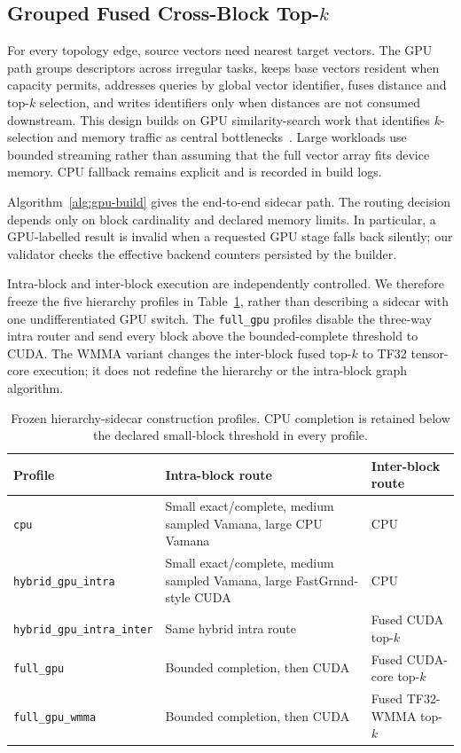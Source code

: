 \documentclass[sigconf,review,anonymous]{acmart}
\begin{document}
\subsection{Grouped Fused Cross-Block Top-$k$}
For every topology edge, source vectors need nearest target vectors.  The GPU
path groups descriptors across irregular tasks, keeps base vectors resident
when capacity permits, addresses queries by global vector identifier, fuses
distance and top-$k$ selection, and writes identifiers only when distances are
not consumed downstream.  This design builds on GPU similarity-search work
that identifies $k$-selection and memory traffic as central
bottlenecks~\cite{johnson2021gpu}.  Large workloads use bounded streaming
rather than assuming that the full vector array fits device memory.  CPU
fallback remains explicit and is recorded in build logs.

Algorithm~\ref{alg:gpu-build} gives the end-to-end sidecar path.  The routing
decision depends only on block cardinality and declared memory limits.  In
particular, a GPU-labelled result is invalid when a requested GPU stage falls
back silently; our validator checks the effective backend counters persisted
by the builder.

Intra-block and inter-block execution are independently controlled.  We
therefore freeze the five hierarchy profiles in
Table~\ref{tab:hierarchy-build-profiles}, rather than describing a sidecar with
one undifferentiated GPU switch.  The \texttt{full\_gpu} profiles disable the
three-way intra router and send every block above the bounded-complete
threshold to CUDA.  The WMMA variant changes the inter-block fused top-$k$ to
TF32 tensor-core execution; it does not redefine the hierarchy or the
intra-block graph algorithm.

\begin{table}[t]
\caption{Frozen hierarchy-sidecar construction profiles.  CPU completion is
retained below the declared small-block threshold in every profile.}
\label{tab:hierarchy-build-profiles}
\centering
\scriptsize
\begin{tabular}{p{}p{}p{}}
\toprule
Profile & Intra-block route & Inter-block route \\
\midrule
\texttt{cpu} & Small exact/complete, medium sampled Vamana, large CPU Vamana & CPU \\
\texttt{hybrid\_gpu\_intra} & Small exact/complete, medium sampled Vamana, large FastGrnnd-style CUDA & CPU \\
\texttt{hybrid\_gpu\_intra\_inter} & Same hybrid intra route & Fused CUDA top-$k$ \\
\texttt{full\_gpu} & Bounded completion, then CUDA & Fused CUDA-core top-$k$ \\
\texttt{full\_gpu\_wmma} & Bounded completion, then CUDA & Fused TF32-WMMA top-$k$ \\
\bottomrule
\end{tabular}
\end{table}
\end{document}

